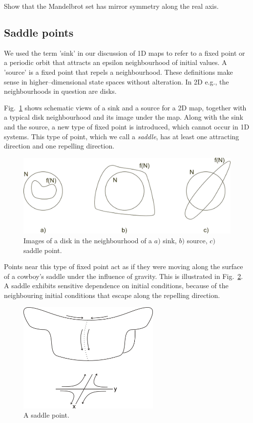 \begin{sidebar}
\begin{ex}
Show that the Mandelbrot set has mirror symmetry along the real axis.
\end{ex}
\end{sidebar}

\subsection{Saddle points}

We used the term 'sink' in our discussion of 1D maps to refer to a fixed point or a periodic orbit that attracts an epsilon neighbourhood of initial values. A 'source' is a fixed point that repels a neighbourhood. These definitions make sense in higher--dimensional state spaces without alteration. In 2D e.g., the neighbourhoods in question are disks.

Fig.~\ref{fig-circle-images} shows schematic views of a sink and a source for a 2D map, together with a typical disk neighbourhood and its image under the map. Along with the sink and the source, a new type of fixed point is introduced, which cannot occur in 1D systems. This type of point, which we call a \emph{saddle}, has at least one attracting direction and one repelling direction. 
\begin{figure}
\centering
\includegraphics[width=12cm]{dynamic/figures/circle_images}
\caption{Images of a disk in the neighbourhood of a $a)$ sink, $b)$ source, $c)$ saddle point.}
\label{fig-circle-images}
\end{figure} 

Points near this type of fixed point act as if they were moving along the surface of a cowboy's saddle under the influence of gravity. This is illustrated in Fig.~\ref{fig-saddle}. A saddle exhibits sensitive dependence on initial conditions, because of the neighbouring initial conditions that escape along the repelling direction.

\begin{figure}
\centering
\includegraphics[width=7cm]{dynamic/figures/saddle}
\caption{A saddle point.}
\label{fig-saddle}
\end{figure} 

